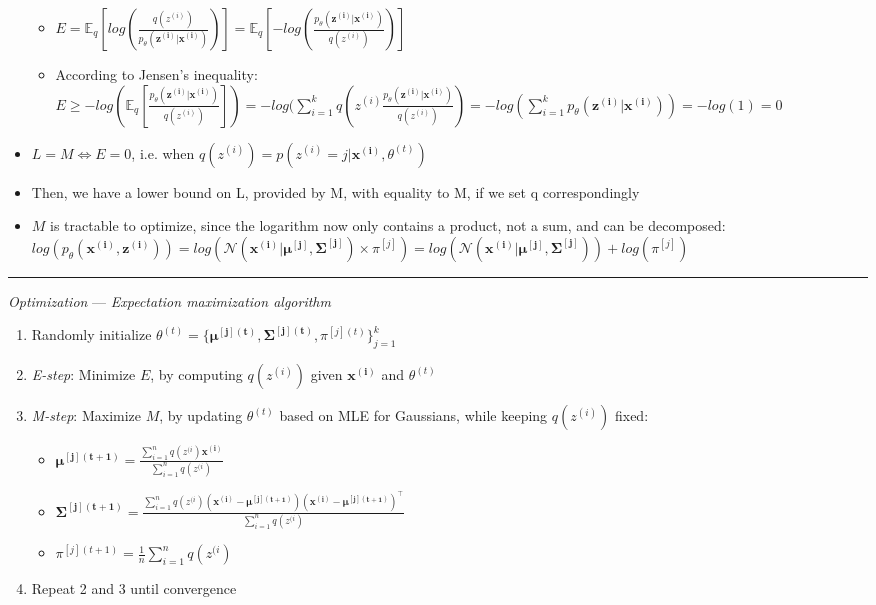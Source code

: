 \begin{itemize}
    \begin{itemize}
        \item $E = \mathbb{E}_q[ log(\frac{ q(z^{(i)}) }{ p_{\theta}(\boldsymbol{z^{(i)}} | \boldsymbol{x^{(i)}}) }) ] = \mathbb{E}_q[ -log(\frac{ p_{\theta}(\boldsymbol{z^{(i)}} | \boldsymbol{x^{(i)}}) }{ q(z^{(i)}) }) ]$
        \item According to Jensen's inequality: $E \geq -log(\mathbb{E}_q[\frac{ p_{\theta}(\boldsymbol{z^{(i)}} | \boldsymbol{x^{(i)}}) }{ q(z^{(i)}) }]) = -log(\sum_{i=1}^k q(z^{(i)} \frac{ p_{\theta}(\boldsymbol{z^{(i)}} | \boldsymbol{x^{(i)}}) }{ q(z^{(i)}) }) = -log(\sum_{i=1}^k p_{\theta}(\boldsymbol{z^{(i)}} | \boldsymbol{x^{(i)}})) = -log(1) = 0$
    \end{itemize}
    \item $L = M \Leftrightarrow E = 0$, i.e. when $q(z^{(i)}) = p( z^{(i)} = j | \boldsymbol{x^{(i)}}, \theta^{(t)} )$
    \item Then, we have a lower bound on L, provided by M, with equality to M, if we set q correspondingly
    \item $M$ is tractable to optimize, since the logarithm now only contains a product, not a sum, and can be decomposed: $log(p_{\theta}(\boldsymbol{x^{(i)}}, \boldsymbol{z^{(i)}})) = log( \mathcal{N}(\boldsymbol{x^{(i)}} | \boldsymbol{\mu^{[j]}}, \boldsymbol{\Sigma^{[j]}}) \times \pi^{[j]} ) = log(\mathcal{N}(\boldsymbol{x^{(i)}} | \boldsymbol{\mu^{[j]}}, \boldsymbol{\Sigma^{[j]}})) + log(\pi^{[j]})$
\end{itemize}

{\color{lightgray}\hrule height 0.001mm}

\emph{Optimization} --- \emph{Expectation maximization algorithm}
\begin{enumerate}
    \item Randomly initialize $\theta^{(t)} = \{ \boldsymbol{\mu^{[j](t)}}, \boldsymbol{\Sigma^{[j](t)}}, \pi^{[j](t)} \}_{j=1}^k$
    \item \emph{E-step}: Minimize $E$, by computing $q(z^{(i)})$ given $\boldsymbol{x^{(i)}}$ and $\theta^{(t)}$
    \item \emph{M-step}: Maximize $M$, by updating $\theta^{(t)}$ based on MLE for Gaussians, while keeping $q(z^{(i)})$ fixed:
    \begin{itemize}
        \item $\boldsymbol{\mu^{[j](t+1)}} = \frac{ \sum_{i=1}^n q(z^{(i}) \boldsymbol{x^{(i)}} }{ \sum_{i=1}^n q(z^{(i}) }$
        \item $\boldsymbol{\Sigma^{[j](t+1)}} = \frac{ \sum_{i=1}^n q(z^{(i}) ( \boldsymbol{x^{(i)}} - \boldsymbol{\mu^{[j](t+1)}} )( \boldsymbol{x^{(i)}} - \boldsymbol{\mu^{[j](t+1)}} )^\intercal }{ \sum_{i=1}^n q(z^{(i}) }$
        \item $\pi^{[j](t+1)} = \frac{1}{n} \sum_{i=1}^n q(z^{(i})$
    \end{itemize}
    \item Repeat 2 and 3 until convergence
\end{enumerate}

